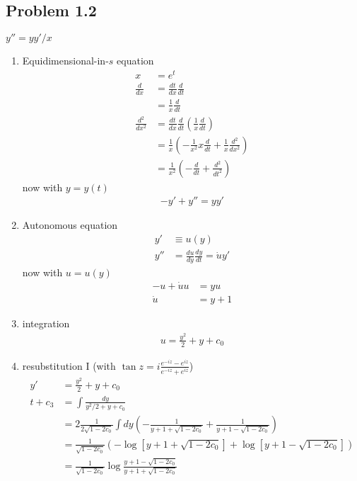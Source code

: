 \documentclass[../main.tex]{subfiles}
\begin{document}
\subsection{Problem 1.2}
$y''=yy'/x$
\begin{enumerate}
    \item Equidimensional-in-$s$ equation
    \begin{align}
        x&=e^t\\
        \frac{d}{dx}&=\frac{dt}{dx}\frac{d}{dt}\\
        &=\frac{1}{x}\frac{d}{dt}\\
        \frac{d^2}{dx^2}&=\frac{dt}{dx}\frac{d}{dt}\left(\frac{1}{x}\frac{d}{dt}\right)\\
        &=\frac{1}{x}\left(-\frac{1}{x^2}x\frac{d}{dt}+\frac{1}{x}\frac{d^2}{dx^2}\right)\\
        &=\frac{1}{x^2}\left(-\frac{d}{dt}+\frac{d^2}{dt^2}\right)
    \end{align}
    now with $y=y(t)$
    \begin{align}
        -y'+y''=yy'
    \end{align}
    \item Autonomous equation
    \begin{align}
        y'&\equiv u(y)\\
        y''&=\frac{du}{dy}\frac{dy}{dt}=\dot u y'
    \end{align}
    now with $u=u(y)$
    \begin{align}
        -u+\dot u u&=y u\\
        \dot u&=y+1
    \end{align}
    \item integration
    \begin{align}
        u=\frac{y^2}{2}+y+c_0
    \end{align}
    \item resubstitution I (with $\tan z = i\frac{e^{-iz}-e^{iz}}{e^{-iz}+e^{iz}}$)
    \begin{align}
        y'&=\frac{y^2}{2}+y+c_0\\
        t+c_3&=\int\frac{dy}{y^2/2+y+c_0}\\
        &=2\frac{1}{2\sqrt{1-2c_0}}\int dy\left(-\frac{1}{y+1+\sqrt{1-2c_0}}+\frac{1}{y+1-\sqrt{1-2c_0}}\right)\\
        &=\frac{1}{\sqrt{1-2c_0}}\left(-\log\left[y+1+\sqrt{1-2c_0}\right]+\log\left[y+1-\sqrt{1-2c_0}\right]\right)\\
        &=\frac{1}{\sqrt{1-2c_0}}\log\frac{y+1-\sqrt{1-2c_0}}{y+1+\sqrt{1-2c_0}}\\

\end{align}
\end{enumerate}
\end{document}
